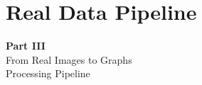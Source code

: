 \documentclass[aspectratio=169]{beamer}
\begin{document}
\section{Real Data Pipeline}

\begin{frame}
    \begin{center}
        {\Huge \textbf{Part III}}\\[1em]
        {\LARGE From Real Images to Graphs}\\[0.5em]
        {\large Processing Pipeline}
    \end{center}
\end{frame}
\end{document}
